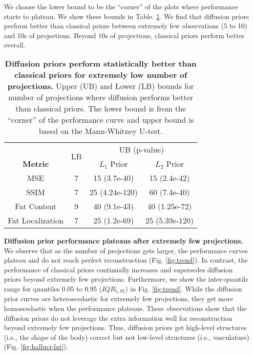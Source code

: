 We choose the lower bound to be the ``corner'' of the plots where performance starts to plateau.
We show these bounds in Table. \ref{tab:bounds}.
We find that diffusion priors perform better than classical priors between extremely few observations (5 to 10) and 10s of projections.
Beyond $10$s of projections, classical priors perform better overall.
\begin{table}[t]
\label{tab:bounds}
\centering
{%
\begin{tabular}{c|cl|cc|}
\cline{2-5}
 & \multicolumn{2}{c|}{\multirow{2}{*}{LB}} & \multicolumn{2}{c|}{UB (p-value)} \\ \cline{1-1} \cline{4-5} 
\multicolumn{1}{|c|}{\textbf{Metric}} & \multicolumn{2}{c|}{} & \multicolumn{1}{c|}{$L_1$ Prior} & $L_2$ Prior \\ \hline
\multicolumn{1}{|c|}{MSE} & \multicolumn{2}{c|}{7} & \multicolumn{1}{c|}{15 (3.7e-40)} & 15 (2.4e-42) \\ \hline
\multicolumn{1}{|c|}{SSIM} & \multicolumn{2}{c|}{7} & \multicolumn{1}{c|}{25 (4.24e-120)} & 60 (7.4e-40) \\ \hline
\multicolumn{1}{|c|}{Fat Content} & \multicolumn{2}{c|}{9} & \multicolumn{1}{c|}{40 (9.1e-43)} & 40 (1.25e-72) \\ \hline
\multicolumn{1}{|c|}{Fat Localization} & \multicolumn{2}{c|}{7} & \multicolumn{1}{c|}{25 (1.2e-69)} & 25 (5.39e-120) \\ \hline
\end{tabular}%
}
\caption{\textbf{Diffusion priors perform statistically better than classical priors for extremely low number of projections.} Upper (UB) and Lower (LB) bounds for number of projections where diffusion performs better than classical priors. The lower bound is from the ``corner'' of the performance curve and upper bound is based on the Mann-Whitney U-test.
}
\end{table}

\noindent\textbf{Diffusion prior performance plateaus after extremely few projections. }
We observe that as the number of projections gets larger, the performance curves plateau and do not reach perfect reconstruction (Fig. \ref{fig:trend}).
In contrast, the performance of classical priors continually increases and supersedes diffusion priors beyond extremely few projections.
Furthermore, we show the inter-quantile range for quantiles 0.05 to 0.95 ($IQR_{5,95}$) in Fig. \ref{fig:trend}.
While the diffusion prior curves are heteroscedastic for extremely few projections, they get more homoscedastic when the performance plateaus.
These observations show that the diffusion priors do not leverage the extra information well for reconstruction beyond extremely few projections.
Thus, diffusion priors get high-level structures (i.e., the shape of the body) correct but not low-level structures (i.e., vasculature) (Fig. \ref{fig:halluci-fat}).

